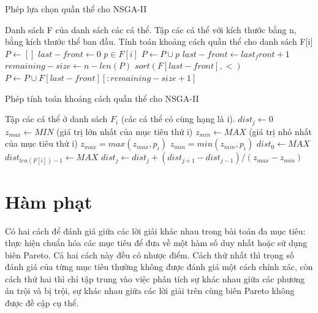 \documentclass{hust}
\begin{document}
\begin{algorithm}[H]
	\caption{Phép lựa chọn quần thể cho \gls{NSGA-II}}
	\label{alg:select_parents}
	\begin{algorithmic}[1]
		\Require Danh sách F của danh sách các cá thể.
		\Ensure Tập các cá thể với kích thước bằng n, bằng kích thước thể ban đầu.
			\State Tính toán khoảng cách quần thể cho danh sách F[i]
		\EndFor
		\State $P \leftarrow []$
		\State $last-front \leftarrow 0$
				\For $p \in F[i]$
					$P \leftarrow P \cup p$
				\EndFor
				\State $last-front \leftarrow last_front+1$
			\EndIf
		\EndFor
		\State $remaining-size \leftarrow n - len(P)$
			\State $sort(F[last-front], <)$
			\State $P \leftarrow P \cup F[last-front][:remaining-size+1]$
		\EndIf
	\end{algorithmic}
\end{algorithm}

\begin{algorithm}[H]
	\caption{Phép tính toán khoảng cách quần thể cho \gls{NSGA-II}}
	\label{alg:crownding_distance}
	\begin{algorithmic}[1]
		\Require Tập các cá thể ở danh sách $F_i$ (các cá thể có cùng hạng là i).
			\State $dist_j \leftarrow 0$
		\EndFor
			\State $z_{max} \leftarrow MIN$ (giá trị lớn nhất của mục tiêu thứ i)
			\State $z_{min} \leftarrow MAX$ (giá trị nhỏ nhất của mục tiêu thứ i)
				\State $z_{max} = max(z_{max}, p_i)$
				\State $z_{min} = min(z_{min}, p_i)$
			\EndFor
			\State $dist_0 \leftarrow MAX$
			\State $dist_{len(F[i])-1} \leftarrow MAX$
				\State $dist_j \leftarrow dist_j + (dist_{j+1} - dist_{j-1})/(z_{max} - z_{min})$
			\EndFor
		\EndFor
	\end{algorithmic}
\end{algorithm}
\section{Hàm phạt}
Có hai cách để đánh giá giữa các lời giải khác nhau trong bài toán đa mục tiêu: thực hiện chuẩn hóa các mục tiêu để đưa về một hàm số duy nhất hoặc sử dụng biên Pareto. Cả hai cách này đều có nhược điểm. Cách thứ nhất thì trọng số đánh giá của từng mục tiêu thường không được đánh giá một cách chính xác, còn cách thứ hai thì chỉ tập trung vào việc phân tích sự khác nhau giữa các phương án trội và bị trội, sự khác nhau giữa các lời giải trên cùng biên Pareto không được đề cập cụ thể. 
\end{document}
